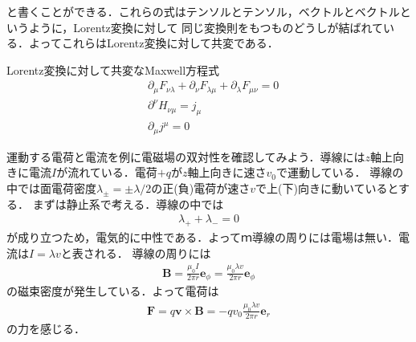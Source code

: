 \documentclass{report}
\begin{document}
  と書くことができる．これらの式はテンソルとテンソル，ベクトルとベクトルというように，Lorentz変換に対して
  同じ変換則をもつものどうしが結ばれている．よってこれらはLorentz変換に対して共変である．
  \begin{itembox}[l]{Lorentz変換に対して共変なMaxwell方程式}
    \begin{align}
      &\partial_\mu F_{\nu\lambda} + \partial_\nu F_{\lambda\mu} + \partial_\lambda F_{\mu\nu} = 0\\
      &\partial^{\nu}H_{\nu\mu}=j_\mu\\
      &\partial_\mu j^\mu = 0
    \end{align}
  \end{itembox}

  運動する電荷と電流を例に電磁場の双対性を確認してみよう．導線には$z$軸上向きに電流$I$が流れている．電荷$+q$が$z$軸上向きに速さ$v_0$で運動している．
  導線の中では面電荷密度$\lambda_{\pm} = \pm\lambda/2$の正(負)電荷が速さ$v$で上(下)向きに動いているとする．
  まずは静止系で考える．導線の中では
  \begin{align}
    \lambda_{+} + \lambda_{-} = 0
  \end{align}
  が成り立つため，電気的に中性である．よってｍ導線の周りには電場は無い．電流は$I=\lambda v$と表される．
  導線の周りには
  \begin{align}
    \bm{B} = \frac{\mu_0I}{2\pi r} \bm{e}_{\phi} = \frac{\mu_0 \lambda v}{2\pi r} \bm{e}_{\phi}
  \end{align}
  の磁束密度が発生している．よって電荷は
  \begin{align}
    \bm{F} = q\bm{v}\times\bm{B} = -qv_0\frac{\mu_0 \lambda v}{2\pi r}\bm{e}_r
  \end{align}
  の力を感じる．
\end{document}

